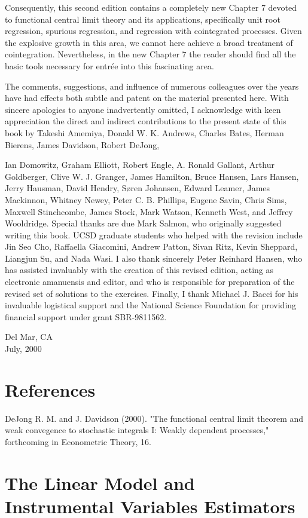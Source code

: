 \documentclass[10pt]{article}
\begin{document}
Consequently, this second edition contains a completely new Chapter 7 devoted to functional central limit theory and its applications, specifically unit root regression, spurious regression, and regression with cointegrated processes. Given the explosive growth in this area, we cannot here achieve a broad treatment of cointegration. Nevertheless, in the new Chapter 7 the reader should find all the basic tools necessary for entrée into this fascinating area.

The comments, suggestions, and influence of numerous colleagues over the years have had effects both subtle and patent on the material presented here. With sincere apologies to anyone inadvertently omitted, I acknowledge with keen appreciation the direct and indirect contributions to the present state of this book by Takeshi Amemiya, Donald W. K. Andrews, Charles Bates, Herman Bierens, James Davidson, Robert DeJong,

Ian Domowitz, Graham Elliott, Robert Engle, A. Ronald Gallant, Arthur Goldberger, Clive W. J. Granger, James Hamilton, Bruce Hansen, Lars Hansen, Jerry Hausman, David Hendry, Søren Johansen, Edward Leamer, James Mackinnon, Whitney Newey, Peter C. B. Phillips, Eugene Savin, Chris Sims, Maxwell Stinchcombe, James Stock, Mark Watson, Kenneth West, and Jeffrey Wooldridge. Special thanks are due Mark Salmon, who originally suggested writing this book. UCSD graduate students who helped with the revision include Jin Seo Cho, Raffaella Giacomini, Andrew Patton, Sivan Ritz, Kevin Sheppard, Liangjun Su, and Nada Wasi. I also thank sincerely Peter Reinhard Hansen, who has assisted invaluably with the creation of this revised edition, acting as electronic amanuensis and editor, and who is responsible for preparation of the revised set of solutions to the exercises. Finally, I thank Michael J. Bacci for his invaluable logistical support and the National Science Foundation for providing financial support under grant SBR-9811562.

Del Mar, CA\\
July, 2000

\section*{References}
DeJong R. M. and J. Davidson (2000). "The functional central limit theorem and weak convegence to stochastic integrals I: Weakly dependent processes," forthcoming in Econometric Theory, 16.

\section*{The Linear Model and Instrumental Variables Estimators}
\end{document}
